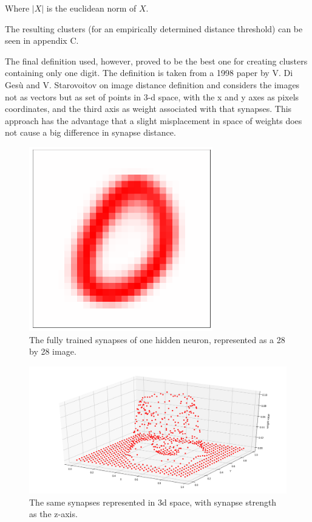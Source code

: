 \documentclass[a4paper]{report}
\begin{document}
Where $|X|$ is the euclidean norm of $X$.

The resulting clusters (for an empirically determined distance threshold) can be seen in appendix C.

The final definition used, however, proved to be the best one for creating clusters containing only one digit.
The definition is taken from a 1998 paper by V. Di Gesù and V. Starovoitov on image distance definition and considers the images not as vectors but as set of points in 3-d space, with the x and y axes as pixels coordinates, and the third axis as weight associated with that synapses.
This approach has the advantage that a slight misplacement in space of weights does not cause a big difference in synapse distance.

\begin{figure} [H]
    \centering
    \includegraphics [width=8cm ] {o/zero.png}
    \caption{The fully trained synapses of one hidden neuron, represented as a 28 by 28 image.}
    \label{zero}
\end{figure}

\begin{figure} [H]
    \centering
    \includegraphics [width=12cm ] {o/zero_three.png}
    \caption{The same synapses represented in 3d space, with synapse strength as the z-axis.}
    \label{zero_three}
\end{figure}
\end{document}
